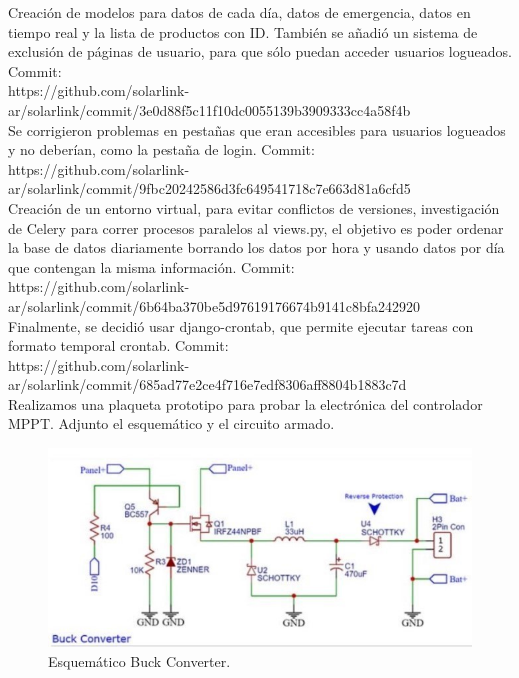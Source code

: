 Creación de modelos para datos de cada día, datos de emergencia, datos en tiempo real y la lista de productos con ID. También se añadió un sistema de exclusión de páginas de usuario, para que sólo puedan acceder usuarios logueados. Commit: \\
https://github.com/solarlink-\\ar/solarlink/commit/3e0d88f5c11f10dc0055139b3909333cc4a58f4b\\

Se corrigieron problemas en pestañas que eran accesibles para usuarios logueados y no deberían, como la pestaña de login. Commit:\\
https://github.com/solarlink-\\ar/solarlink/commit/9fbc20242586d3fc649541718c7e663d81a6cfd5\\

Creación de un entorno virtual, para evitar conflictos de versiones, investigación de Celery para correr procesos paralelos al views.py, el objetivo es poder ordenar la base de datos diariamente borrando los datos por hora y usando datos por día que contengan la misma información. Commit:\\
https://github.com/solarlink-\\ar/solarlink/commit/6b64ba370be5d97619176674b9141c8bfa242920\\

Finalmente, se decidió usar django-crontab, que permite ejecutar tareas con formato temporal crontab. Commit:\\
https://github.com/solarlink-\\ar/solarlink/commit/685ad77e2ce4f716e7edf8306aff8804b1883c7d\\


Realizamos una plaqueta prototipo para probar la electrónica del controlador MPPT.
Adjunto el esquemático y el circuito armado.\\

\begin{figure}[H]
    \centering
    \includegraphics[width=0.75\linewidth]{informes/Screenshot_19.jpg}
    \caption{Esquemático Buck Converter.}
\end{figure}

